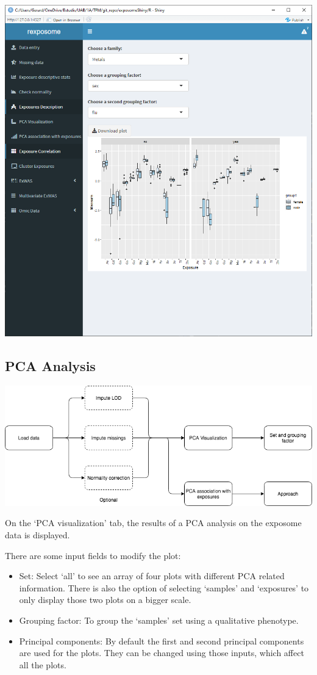 \documentclass[
]{book}
\providecommand{\tightlist}{%
  \setlength{\itemsep}{0pt}\setlength{\parskip}{0pt}}
\begin{document}
\includegraphics{images/analysis4_2_2.png}

\hypertarget{pca-analysis}{%
\subsection{PCA Analysis}\label{pca-analysis}}

\includegraphics{images/analysis5_1.png}

On the `PCA visualization' tab, the results of a PCA analysis on the exposome data is displayed.

There are some input fields to modify the plot:

\begin{itemize}
\tightlist
\item
  Set: Select `all' to see an array of four plots with different PCA related information. There is also the option of selecting `samples' and `exposures' to only display those two plots on a bigger scale.
\item
  Grouping factor: To group the `samples' set using a qualitative phenotype.
\item
  Principal components: By default the first and second principal components are used for the plots. They can be changed using those inputs, which affect all the plots.
\end{itemize}
\end{document}
